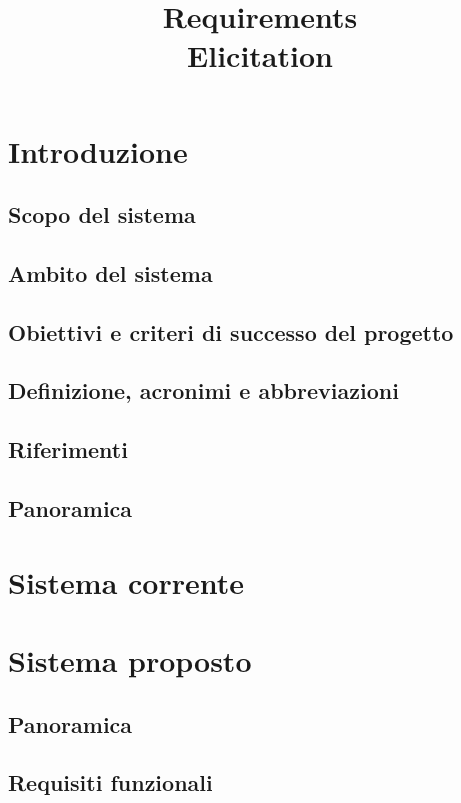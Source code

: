 \documentclass[12pt]{article}
\title{Requirements\\Elicitation}
\author{\presentatoda}
\begin{document}
\maketitle

\tableofcontents
\clearpage
\begin{versionhistory}
\end{versionhistory}
\clearpage

\section{Introduzione}
\subsection{Scopo del sistema}

\subsection{Ambito del sistema}
\subsection{Obiettivi e criteri di successo del progetto}
\subsection{Definizione, acronimi e abbreviazioni}
\subsection{Riferimenti}
\subsection{Panoramica}
\section{Sistema corrente}
\section{Sistema proposto}
\subsection{Panoramica}
\subsection{Requisiti funzionali}
\end{document}
